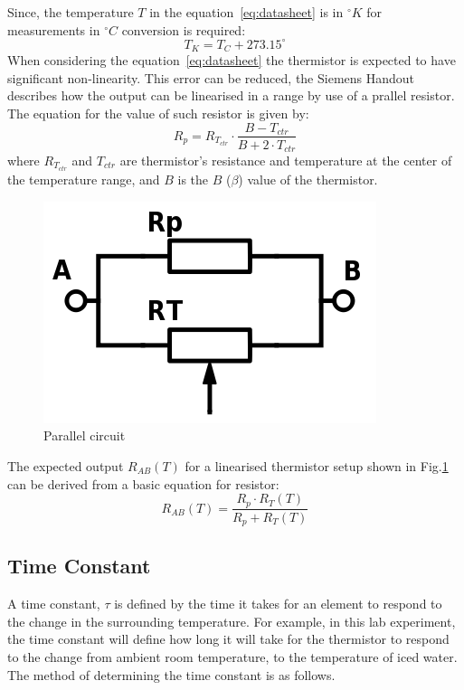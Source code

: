 \documentclass[a4,11pt]{article}
\begin{document}
Since, the temperature $T$ in the equation~\ref{eq:datasheet} is in $^\circ K$ for measurements in $^\circ C$ conversion is required:
\begin{equation}
\label{eq:ctok}
T_K=T_C+273.15^\circ
\end{equation}
When considering the equation~\ref{eq:datasheet} the thermistor is expected to have significant non-linearity. This error can be reduced, the Siemens Handout describes how the output can be linearised in a range by use of a prallel resistor. The equation for the value of such resistor is given by:
\begin{equation}
\label{eq:siemens}
R_p=R_{T_{ctr}}\cdot\frac{B-T_{ctr}}{B+2\cdot T_{ctr}}
\end{equation}
where $R_{T_{ctr}}$ and $T_{ctr}$ are thermistor's resistance and temperature at the center of the temperature range, and $B$ is the $B$ ($\beta$) value of the thermistor.
\begin{figure}[H]
	\label{fig:parallel}
	\centering
	\includegraphics[width=0.75\columnwidth]{parallel.png}
	\caption{
		Parallel circuit
	}
\end{figure}
The expected output $R_{AB}(T)$ for a linearised thermistor setup shown in Fig.\ref{fig:parallel} can be derived from a basic equation for resistor:
\begin{equation}
\label{eq:Rab}
R_{AB}(T)=\frac{R_p\cdot R_T(T)}{R_p+R_T(T)}
\end{equation}
\subsection{Time Constant} \label{sub:time}
A time constant, $\tau$ is defined by the time it takes for an element to respond to the change in the surrounding temperature. For example, in this lab experiment, the time constant will define how long it will take for the thermistor to respond to the change from ambient room temperature, to the temperature of iced water. The method of determining the time constant is as follows.
\end{document}
